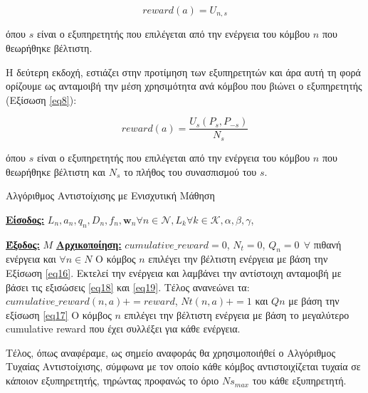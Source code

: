 \begin{equation}
    reward(a) = U_{n,s}
    \label{eq18}
\end{equation}

\noindent
όπου $s$ είναι ο εξυπηρετητής που επιλέγεται από την ενέργεια του κόμβου $n$ που θεωρήθηκε βέλτιστη.

Η δεύτερη εκδοχή, εστιάζει στην προτίμηση των εξυπηρετητών και άρα αυτή τη φορά ορίζουμε ως ανταμοιβή την μέση χρησιμότητα ανά κόμβου που βιώνει ο εξυπηρετητής (Εξίσωση \ref{eq8}):

\begin{equation}
    reward(a) = \frac{U_s(P_s,P_{-s})}{N_s}
    \label{eq19}
\end{equation}

\noindent
όπου $s$ είναι ο εξυπηρετητής που επιλέγεται από την ενέργεια του κόμβου $n$ που θεωρήθηκε βέλτιστη και $N_s$ το πλήθος του συνασπισμού του $s$.

\newpage

\begin{algorithm}[h]
\caption{Αλγόριθμος Αντιστοίχισης με Ενισχυτική Μάθηση} \label{algorithm 3}
\begin{algorithmic}[1]
\STATE \textbf{\underline{Είσοδος:}} ${L_n, a_n, q_n, D_n, f_n, \mathbf{w}_n}{\forall n\in \mathcal{N}}, {L_k}{\forall k \in \mathcal{K}}, \alpha,\beta,\gamma$,

\STATE \textbf{\underline{Έξοδος:}}  $M$
\STATE \textbf{\underline{Αρχικοποίηση:}} $cumulative\_reward = 0$, $N_t = 0$, $Q_n = 0 \>\> \forall$ πιθανή ενέργεια και $\forall n \in N$
\STATE Ο κόμβος $n$ επιλέγει την βέλτιστη ενέργεια με βάση την Εξίσωση \ref{eq16}.
\STATE Εκτελεί την ενέργεια και λαμβάνει την αντίστοιχη ανταμοιβή με βάσει τις εξισώσεις \ref{eq18} και \ref{eq19}.
\STATE Τέλος ανανεώνει τα: $cumulative\_reward(n,a) += reward$, $Nt(n,a) += 1$ και $Qn$ με βάση την εξίσωση \ref{eq17}
\ENDFOR
\ENDWHILE
{}
\STATE Ο κόμβος $n$ επιλέγει την βέλτιστη ενέργεια με βάση το μεγαλύτερο cumulative reward που έχει συλλέξει για κάθε ενέργεια.
\ENDFOR
\end{algorithmic}
\end{algorithm}
\vspace{-7pt}

Τέλος, όπως αναφέραμε, ως σημείο αναφοράς θα χρησιμοποιήθεί ο Αλγόριθμος Τυχαίας Αντιστοίχισης, σύμφωνα με τον οποίο κάθε κόμβος αντιστοιχίζεται τυχαία σε κάποιον εξυπηρετητής, τηρώντας προφανώς το όριο $Ns_{max}$ του κάθε εξυπηρετητή.

